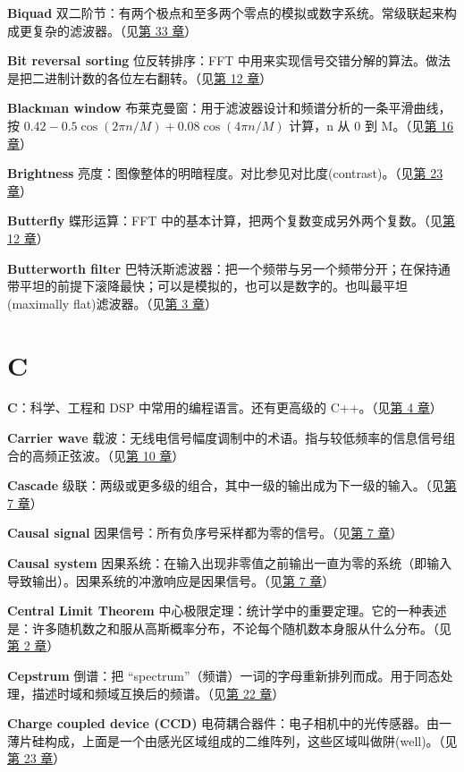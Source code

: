 \textbf{Biquad}
双二阶节：有两个极点和至多两个零点的模拟或数字系统。常级联起来构成更复杂的滤波器。（见\hyperref[ch-33]{第
33 章}）

\textbf{Bit reversal sorting} 位反转排序：FFT
中用来实现信号交错分解的算法。做法是把二进制计数的各位左右翻转。（见\hyperref[ch-12]{第
12 章}）

\textbf{Blackman window}
布莱克曼窗：用于滤波器设计和频谱分析的一条平滑曲线，按
\(0.42 - 0.5\cos(2\pi n/M) + 0.08\cos(4\pi n/M)\) 计算，n 从 0 到
M。（见\hyperref[ch-16]{第 16 章}）

\textbf{Brightness}
亮度：图像整体的明暗程度。对比参见对比度(contrast)。（见\hyperref[ch-23]{第
23 章}）

\textbf{Butterfly} 蝶形运算：FFT
中的基本计算，把两个复数变成另外两个复数。（见\hyperref[ch-12]{第 12
章}）

\textbf{Butterworth filter}
巴特沃斯滤波器：把一个频带与另一个频带分开；在保持通带平坦的前提下滚降最快；可以是模拟的，也可以是数字的。也叫最平坦(maximally
flat)滤波器。（见\hyperref[ch-03]{第 3 章}）

\section{C}

\textbf{C}：科学、工程和 DSP 中常用的编程语言。还有更高级的
C++。（见\hyperref[ch-04]{第 4 章}）

\textbf{Carrier wave}
载波：无线电信号幅度调制中的术语。指与较低频率的信息信号组合的高频正弦波。（见\hyperref[ch-10]{第
10 章}）

\textbf{Cascade}
级联：两级或更多级的组合，其中一级的输出成为下一级的输入。（见\hyperref[ch-07]{第
7 章}）

\textbf{Causal signal}
因果信号：所有负序号采样都为零的信号。（见\hyperref[ch-07]{第 7 章}）

\textbf{Causal system}
因果系统：在输入出现非零值之前输出一直为零的系统（即输入导致输出）。因果系统的冲激响应是因果信号。（见\hyperref[ch-07]{第
7 章}）

\textbf{Central Limit Theorem}
中心极限定理：统计学中的重要定理。它的一种表述是：许多随机数之和服从高斯概率分布，不论每个随机数本身服从什么分布。（见\hyperref[ch-02]{第
2 章}）

\textbf{Cepstrum} 倒谱：把
``spectrum''（频谱）一词的字母重新排列而成。用于同态处理，描述时域和频域互换后的频谱。（见\hyperref[ch-22]{第
22 章}）

\textbf{Charge coupled device (CCD)}
电荷耦合器件：电子相机中的光传感器。由一薄片硅构成，上面是一个由感光区域组成的二维阵列，这些区域叫做阱(well)。（见\hyperref[ch-23]{第
23 章}）

